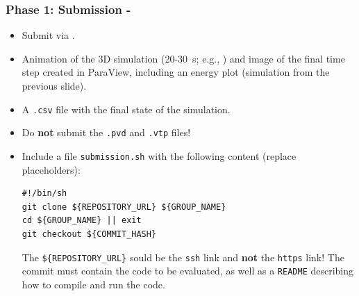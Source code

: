 \begin{frame}[fragile]
  \frametitle{Phase 1: Submission - \dateDeadlinePhaseOne}
  \vspace*{-1em}
  \begin{itemize}
      \item Submit via .
      \item Animation of the 3D simulation (\num{20}-\SI{30}{\second}; e.g., ) and image of the final time step created in ParaView, including an energy plot (simulation from the previous slide).
      \item A \texttt{.csv} file with the final state of the simulation.
      \item Do \textbf{not} submit the \texttt{.pvd} and \texttt{.vtp} files!
      \item Include a file \texttt{submission.sh} with the following content (replace placeholders): \vspace*{.5em}
      \begin{verbatim}
#!/bin/sh
git clone ${REPOSITORY_URL} ${GROUP_NAME}
cd ${GROUP_NAME} || exit
git checkout ${COMMIT_HASH}
      \end{verbatim}

      The \texttt{\$\{REPOSITORY\_URL\}} sould be the \texttt{ssh} link and \textbf{not} the \texttt{https} link! 
      The commit must contain the code to be evaluated, as well as a \texttt{README} describing how to compile and run the code.
  \end{itemize}
\end{frame}



